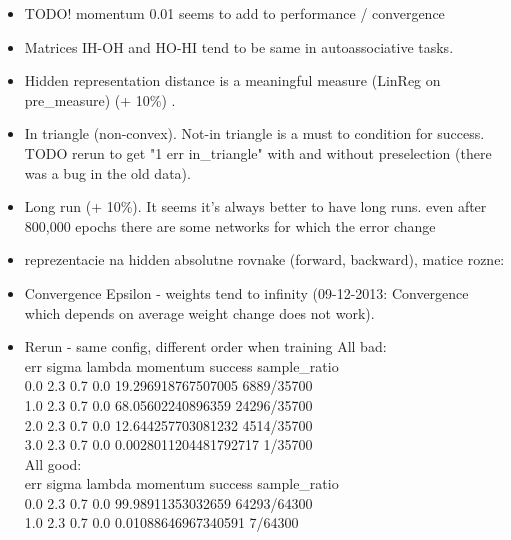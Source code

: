 \begin{itemize} 
\item TODO! momentum 0.01 seems to add to performance / convergence 
\item Matrices IH-OH and HO-HI tend to be same in autoassociative tasks. 
\item Hidden representation distance is a meaningful measure (LinReg on pre\_measure) (+ 10\%) . 
\item In triangle (non-convex). Not-in triangle is a must to condition for success. \\
TODO rerun to get "1 err in\_triangle" with and without preselection (there was a bug in the old data). 
\item Long run (+ 10\%). It seems it's always better to have long runs. even after 800,000 epochs there are some networks for which the error change
\item reprezentacie na hidden absolutne rovnake (forward, backward), matice rozne:
\item Convergence Epsilon - weights tend to infinity (09-12-2013: Convergence which depends on average weight change does not work). 
\item Rerun - same config, different order when training 
All bad: \\
err sigma lambda momentum success sample\_ratio \\
0.0 2.3 0.7 0.0 19.296918767507005 6889/35700 \\
1.0 2.3 0.7 0.0 68.05602240896359 24296/35700 \\
2.0 2.3 0.7 0.0 12.644257703081232 4514/35700 \\
3.0 2.3 0.7 0.0 0.0028011204481792717 1/35700 \\

All good:  \\
err sigma lambda momentum success sample\_ratio \\
0.0 2.3 0.7 0.0 99.98911353032659 64293/64300 \\
1.0 2.3 0.7 0.0 0.01088646967340591 7/64300 \\
\end{itemize}




